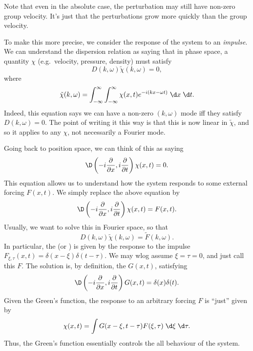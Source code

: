 \documentclass[a4paper]{article}
\begin{document}
Note that even in the absolute case, the perturbation may still have non-zero group velocity. It's just that the perturbations grow more quickly than the group velocity.

To make this more precise, we consider the response of the system to an \emph{impulse}. We can understand the dispersion relation as saying that in phase space, a quantity $\chi$ (e.g.\ velocity, pressure, density) must satisfy
\[
  D(k, \omega) \tilde{\chi}(k, \omega) = 0,
\]
where
\[
  \tilde{\chi}(k, \omega) = \int_{-\infty}^\infty\int_{-\infty}^\infty \chi(x, t) e^{-i(kx - \omega t)}\;\d x\;\d t.
\]
Indeed, this equation says we can have a non-zero $(k, \omega)$ mode iff they satisfy $D(k, \omega) = 0$. The point of writing it this way is that this is now linear in $\tilde{\chi}$, and so it applies to any $\chi$, not necessarily a Fourier mode.

Going back to position space, we can think of this as saying
\[
  \D \left(-i \frac{\partial}{\partial x}, i\frac{\partial}{\partial t}\right) \chi(x, t) = 0.
\]
This equation allows us to understand how the system responds to some external forcing $F(x, t)$. We simply replace the above equation by
\[
  \D \left(-i\frac{\partial}{\partial x}, i\frac{\partial}{\partial t}\right) \chi(x, t) = F(x,t).
\]
Usually, we want to solve this in Fourier space, so that
\[
  D(k, \omega) \tilde{\chi}(k, \omega) = \tilde{F}(k, \omega).
\]
In particular, the  (or ) is given by the response to the impulse $F_{\xi, \tau}(x, t) = \delta(x - \xi) \delta(t - \tau)$. We may wlog assume $\xi = \tau = 0$, and just call this $F$. The solution is, by definition, the  $G(x, t)$, satisfying
\[
  \D \left(-i\frac{\partial}{\partial x}, i\frac{\partial}{\partial t}\right) G(x, t) = \delta(x)\delta(t).
\]
Given the Green's function, the response to an arbitrary forcing $F$ is ``just'' given by
\[
  \chi(x, t) = \int G(x - \xi, t - \tau) F(\xi, \tau)\;\d \xi \;\d \tau.
\]
Thus, the Green's function essentially controls the all behaviour of the system.

%
%
%
\end{document}
